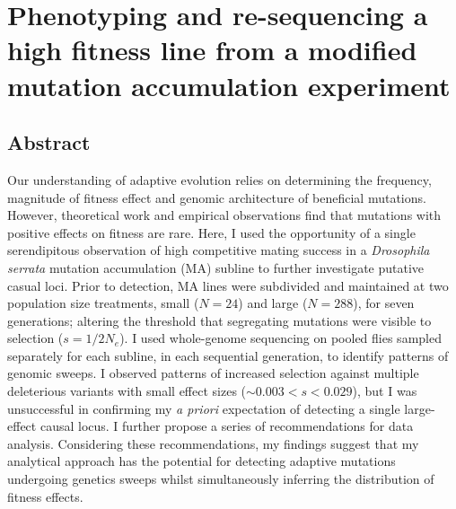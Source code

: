 \chapter{Phenotyping and re-sequencing a high fitness line from a modified mutation accumulation experiment} 
 \vspace{2cm}
 
\section{Abstract}
Our understanding of adaptive evolution relies on determining the frequency, magnitude of fitness effect and genomic architecture of beneficial mutations. However, theoretical work and empirical observations find that mutations with positive effects on fitness are rare. Here, I used the opportunity of a single serendipitous observation of high competitive mating success in a \textit{Drosophila serrata} mutation accumulation (MA) subline to further investigate putative casual loci. Prior to detection, MA lines were subdivided and maintained at two population size treatments, small ($N = 24$) and large ($N = 288$), for seven generations; altering the threshold that segregating mutations were visible to selection ($s = 1/2N_e$). I used whole-genome sequencing on pooled flies sampled separately for each subline, in each sequential generation, to identify patterns of genomic sweeps. I observed patterns of increased selection against multiple deleterious variants with small effect sizes ($\sim 0.003 < s < 0.029$), but I was unsuccessful in confirming my \textit{a priori} expectation of detecting a single large-effect causal locus. I further propose a series of recommendations for data analysis. Considering these recommendations, my findings suggest that my analytical approach has the potential for detecting adaptive mutations undergoing genetics sweeps whilst simultaneously inferring the distribution of fitness effects. \par

\newpage

